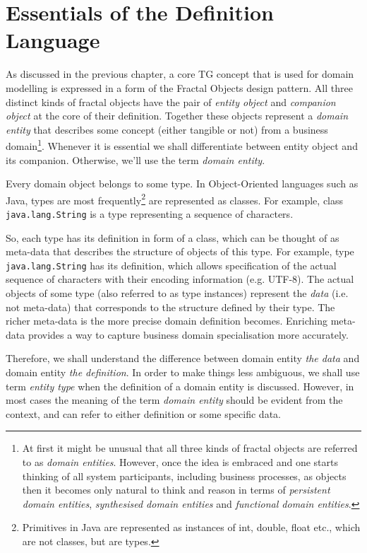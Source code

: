 \chapter{Essentials of the Definition Language}\label{ch01:01}


  As discussed in the previous chapter, a core TG concept that is used for domain modelling is expressed in a form of the Fractal Objects design pattern.
  All three distinct kinds of fractal objects have the pair of \emph{entity object} and \emph{companion object} at the core of their definition.
  Together these objects represent a \emph{domain entity} that describes some concept (either tangible or not) from a business domain\footnote{At first it might be unusual that all three kinds of fractal objects are referred to as \emph{domain entities}. However, once the idea is embraced and one starts thinking of all system participants, including business processes, as objects then it becomes only natural to think and reason in terms of \emph{persistent domain entities}, \emph{synthesised domain entities} and \emph{functional domain entities}.}.
  Whenever it is essential we shall differentiate between entity object and its companion.
  Otherwise, we'll use the term \emph{domain entity}.
    
  Every domain object belongs to some type.
  In Object-Oriented languages such as Java, types are most frequently\footnote{Primitives in Java are represented as instances of int, double, float etc., which are not classes, but are types.} are represented as classes.
  For example, class \texttt{java.lang.String} is a type representing a sequence of characters.
  
  So, each type has its definition in form of a class, which can be thought of as meta-data that describes the structure of objects of this type.
  For example, type \texttt{java.lang.String} has its definition, which allows specification of the actual sequence of characters with their encoding information (e.g. UTF-8).
  The actual objects of some type (also referred to as type instances) represent the \emph{data} (i.e. not meta-data) that corresponds to the structure defined by their type.  
  The richer meta-data is the more precise domain definition becomes.
  Enriching meta-data provides a way to capture business domain specialisation more accurately.
  
  Therefore, we shall understand the difference between domain entity \emph{the data} and domain entity \emph{the definition}.
  In order to make things less ambiguous, we shall use term \emph{entity type} when the definition of a domain entity is discussed.
  However, in most cases the meaning of the term \emph{domain entity} should be evident from the context, and can refer to either definition or some specific data.
 

